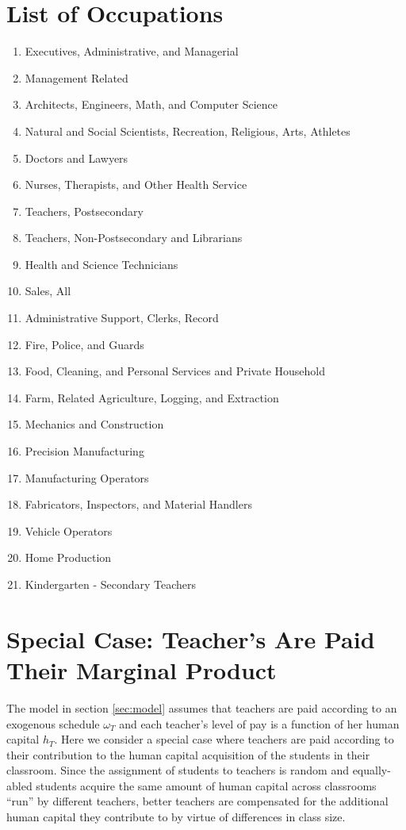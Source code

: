 \documentclass[onehalfspacing,11pt]{article}
\begin{document}
	\section{List of Occupations}
	\begin{enumerate}
		\item Executives, Administrative, and Managerial
		\item Management Related
		\item Architects, Engineers, Math, and Computer Science
		\item Natural and Social Scientists, Recreation, Religious, Arts, Athletes
		\item Doctors and Lawyers
		\item Nurses, Therapists, and Other Health Service
		\item Teachers, Postsecondary
		\item Teachers, Non-Postsecondary and Librarians
		\item Health and Science Technicians
		\item Sales, All
		\item Administrative Support, Clerks, Record
		\item Fire, Police, and Guards
		\item Food, Cleaning, and Personal Services and Private Household
		\item Farm, Related Agriculture, Logging, and Extraction
		\item Mechanics and Construction
		\item Precision Manufacturing
		\item Manufacturing Operators
		\item Fabricators, Inspectors, and Material Handlers
		\item Vehicle Operators
		\item Home Production 
		\item Kindergarten - Secondary Teachers
	\end{enumerate}
	
	\section{Special Case: Teacher's Are Paid Their Marginal Product}\label{app:equilibrium}
	The model in section \ref{sec:model} assumes that teachers are paid according to an exogenous schedule $\omega_T$ and each teacher's level of pay is a function of her human capital $h_T$. Here we consider a special case where teachers are paid according to their contribution to the human capital acquisition of the students in their classroom. Since the assignment of students to teachers is random and equally-abled students acquire the same amount of human capital across classrooms ``run'' by different teachers, better teachers are compensated for the additional human capital they contribute to by virtue of differences in class size.
	
\end{document}
